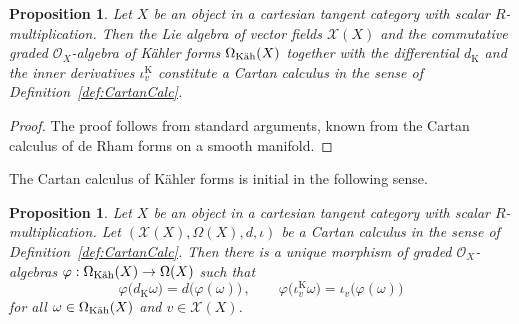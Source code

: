 \documentclass[12pt,reqno, a4paper]{amsart}
\numberwithin{equation}{section}
\theoremstyle{plain}
\newtheorem{Proposition}[Theorem]{Proposition}
\theoremstyle{definition}
\theoremstyle{remark}
\newcommand{\calO}{\mathcal{O}}
\newcommand{\calX}{\mathcal{X}}
\renewcommand{\phi}{\varphi}
\begin{document}
\begin{Proposition}
\label{prop:KaehlerCartan}
Let $X$ be an object in a cartesian tangent category with scalar $R$-multiplication. Then the Lie algebra of vector fields $\calX(X)$ and the commutative graded $\calO_X$-algebra of K\"ahler forms $\Omega_\text{\rm K\"ah}(X)$ together with the differential $d_\mathrm{K}$ and the inner derivatives $\iota^\mathrm{K}_v$ constitute a Cartan calculus in the sense of Definition~\ref{def:CartanCalc}.
\end{Proposition}
\begin{proof}
The proof follows from standard arguments, known from the Cartan calculus of de Rham forms on a smooth manifold.
\end{proof}

The Cartan calculus of K\"ahler forms is initial in the following sense.

\begin{Proposition}
\label{prop:KaehlerInitial}
Let $X$ be an object in a cartesian tangent category with scalar $R$-multiplication. Let $(\calX(X), \Omega(X), d, \iota)$ be a Cartan calculus in the sense of Definition~\ref{def:CartanCalc}. Then there is a unique morphism of graded $\calO_X$-algebras $\phi: \Omega_{\text{\rm K\"ah}}(X) \to \Omega(X)$ such that
\begin{equation*}
  \phi\bigl( d_\mathrm{K} \omega \bigr)
  = d \bigl( \phi(\omega) \bigr)
  \,,\qquad
  \phi\bigl( \iota^\mathrm{K}_v \omega \bigr)
  = \iota_v \bigl( \phi(\omega) \bigr)
\end{equation*}
for all $\omega \in \Omega_\text{\rm K\"ah}(X)$ and $v \in \calX(X)$.
\end{Proposition}
\end{document}
